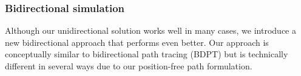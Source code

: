 




\subsubsection{Bidirectional simulation}
\label{sssec:ours_bidir}
%
Although our unidirectional solution works well in many cases, we introduce a new bidirectional approach that performs even better.
Our approach is conceptually similar to bidirectional path tracing (BDPT) but is technically different in several ways due to our position-free path formulation.


